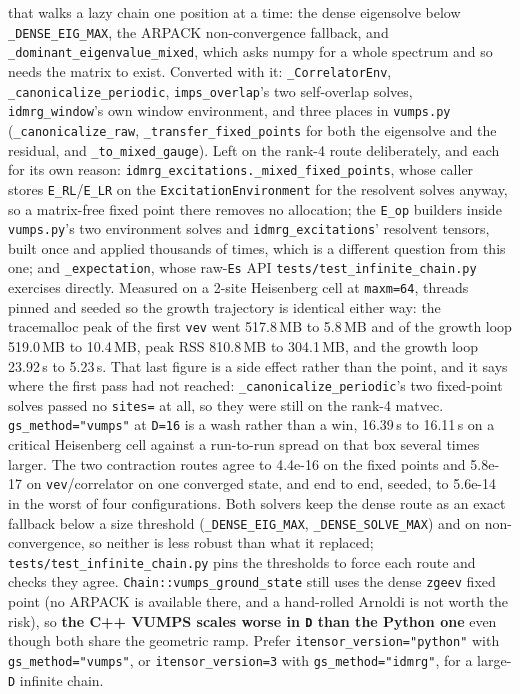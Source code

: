 \documentclass[11pt]{article}
\begin{document}
that walks a lazy chain one position at a time: the dense eigensolve
below \texttt{\_DENSE\_EIG\_MAX}, the ARPACK non-convergence fallback,
and \texttt{\_dominant\_eigenvalue\_mixed}, which asks numpy for a whole
spectrum and so needs the matrix to exist. Converted with it:
\texttt{\_CorrelatorEnv}, \texttt{\_canonicalize\_periodic},
\texttt{imps\_overlap}'s two self-overlap solves,
\texttt{idmrg\_window}'s own window environment, and three places in
\texttt{vumps.py} (\texttt{\_canonicalize\_raw},
\texttt{\_transfer\_fixed\_points} for both the eigensolve and the
residual, and \texttt{\_to\_mixed\_gauge}). Left on the rank-4 route
deliberately, and each for its own reason:
\texttt{idmrg\_excitations.\_mixed\_fixed\_points}, whose caller stores
\texttt{E\_RL}/\texttt{E\_LR} on the \texttt{ExcitationEnvironment} for
the resolvent solves anyway, so a matrix-free fixed point there removes
no allocation; the \texttt{E\_op} builders inside \texttt{vumps.py}'s two
environment solves and \texttt{idmrg\_excitations}' resolvent tensors,
built once and applied thousands of times, which is a different question
from this one; and \texttt{\_expectation}, whose raw-\texttt{Es} API
\texttt{tests/test\_infinite\_chain.py} exercises directly. Measured on a
2-site Heisenberg cell at \texttt{maxm=64}, threads pinned and seeded so
the growth trajectory is identical either way: the tracemalloc peak of
the first \texttt{vev} went 517.8\,MB to 5.8\,MB and of the growth loop
519.0\,MB to 10.4\,MB, peak RSS 810.8\,MB to 304.1\,MB, and the growth
loop 23.92\,s to 5.23\,s. That last figure is a side effect rather than
the point, and it says where the first pass had not reached:
\texttt{\_canonicalize\_periodic}'s two fixed-point solves passed no
\texttt{sites=} at all, so they were still on the rank-4 matvec.
\texttt{gs\_method="vumps"} at \texttt{D=16} is a wash rather than a win,
16.39\,s to 16.11\,s on a critical Heisenberg cell against a run-to-run
spread on that box several times larger. The two contraction routes
agree to 4.4e-16 on the fixed points and 5.8e-17 on
\texttt{vev}/correlator on one converged state, and end to end, seeded,
to 5.6e-14 in the worst of four configurations.
Both solvers keep the dense route as an exact fallback below a size
threshold
(\texttt{\_DENSE\_EIG\_MAX}, \texttt{\_DENSE\_SOLVE\_MAX}) and on
non-convergence, so neither is less robust than what it replaced;
\texttt{tests/test\_infinite\_chain.py} pins the thresholds to force each
route and checks they agree. \texttt{Chain::vumps\_ground\_state} still
uses the dense \texttt{zgeev} fixed point (no ARPACK is available there,
and a hand-rolled Arnoldi is not worth the risk), so \textbf{the C++
VUMPS scales worse in \texttt{D} than the Python one} even though both
share the geometric ramp. Prefer \texttt{itensor\_version="python"} with
\texttt{gs\_method="vumps"}, or \texttt{itensor\_version=3} with
\texttt{gs\_method="idmrg"}, for a large-\texttt{D} infinite chain.
\end{document}
